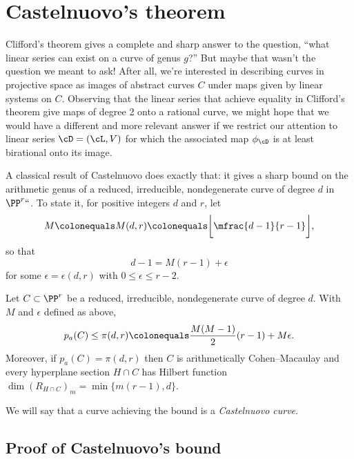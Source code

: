  \section{Castelnuovo's theorem}\label{CastelnuovoSection}

Clifford's theorem gives a complete and sharp answer to the question,
%
``what linear series can exist on a curve of genus $g$?''
But maybe that wasn't the question we meant to ask! After all, we're
interested in describing curves in projective space as images of abstract
curves $C$ under maps given by linear systems on $C$. Observing that
the linear series that achieve equality in 
Clifford's theorem
%
give maps of degree 2 onto a rational curve,
 we might hope that we
would have a 
 different and more relevant
answer if we
restrict our attention to linear series $\cD = (\cL,V)$ for which the
%
associated map $\phi_\cD$ is at least  birational onto its image.

A classical result of Castelnuovo does exactly that: it gives a sharp
bound on the 
arithmetic genus
%
of a reduced, irreducible, nondegenerate
curve of degree $d$ in $\PP^r` `$. To state it, for positive integers $d$
and $r$, let
%
\begin{equation}\label{def of M}
 M \colonequals  
M(d,r)
\colonequals  
\biggl\lfloor\mfrac{d-1}{r-1}\biggr\rfloor,
\end{equation}
so that
$$
 d -1 = M(r-1) + \epsilon
$$ 
for some $\epsilon = 
\epsilon(d,r)
$
 with $0 \leq \epsilon \leq r-2$.
%

\begin{theorem}\label{Castelnuovo's bound}
Let $C \subset \PP^r$ be a reduced, irreducible, nondegenerate curve of
%
degree $d$. With $M$ and $\epsilon$ defined
as above,
$$
p_a(C) \leq \pi(d,r) \colonequals  \frac{M(M-1)}{2}(r-1) + M\epsilon.
$$
Moreover, if $p_a(C) = \pi(d,r)$  then $C$ is arithmetically
%
Cohen--Macaulay and every hyperplane
section $H\cap C$ has 
Hilbert function
%
$
\dim (R_{H\cap C})_{m} = \min\{m(r-1), d\}.
$
\end{theorem}

We will say that a curve achieving the bound is a \emph{Castelnuovo
%
curve}.

\subsection*{Proof of Castelnuovo's bound}

